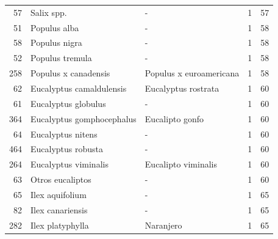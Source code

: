 \begin{longtable}{r p{4cm} p{5cm} c c}
    57            & Salix spp.                        & -                                             & 1             & 57             \\
    51            & Populus alba                      & -                                             & 1             & 58             \\
    58            & Populus nigra                     & -                                             & 1             & 58             \\
    52            & Populus tremula                   & -                                             & 1             & 58             \\
    258           & Populus x canadensis              & Populus x euroamericana                       & 1             & 58             \\
    62            & Eucalyptus camaldulensis          & Eucalyptus rostrata                           & 1             & 60             \\
    61            & Eucalyptus globulus               & -                                             & 1             & 60             \\
    364           & Eucalyptus gomphocephalus         & Eucalipto gonfo                               & 1             & 60             \\
    64            & Eucalyptus nitens                 & -                                             & 1             & 60             \\
    464           & Eucalyptus robusta                & -                                             & 1             & 60             \\
    264           & Eucalyptus viminalis              & Eucalipto viminalis                           & 1             & 60             \\
    63            & Otros eucaliptos                  & -                                             & 1             & 60             \\
    65            & Ilex aquifolium                   & -                                             & 1             & 65             \\
    82            & Ilex canariensis                  & -                                             & 1             & 65             \\
    282           & Ilex platyphylla                  & Naranjero                                     & 1             & 65             \\

\end{longtable}
